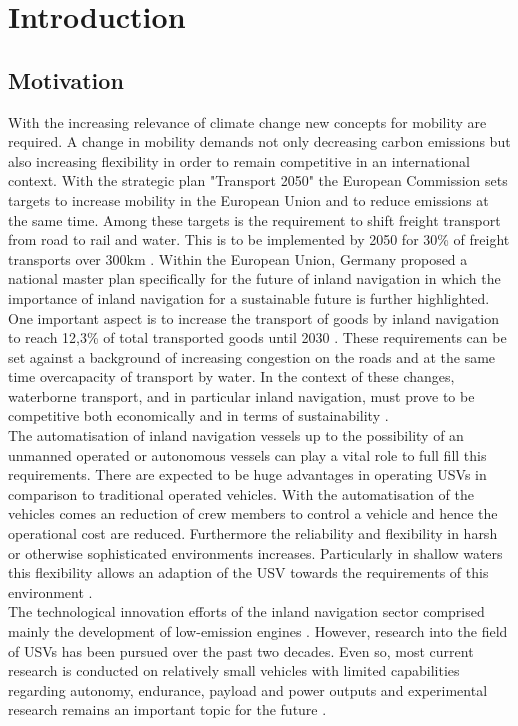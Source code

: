 
\chapter{Introduction}\label{Introduction}
  \section{Motivation}

With the increasing relevance of climate change new concepts for mobility are required. A change in mobility demands not only decreasing carbon emissions but also increasing flexibility in order to remain competitive in an international context. With the strategic plan "Transport 2050" the European Commission sets targets to increase mobility in the European Union and to reduce emissions at the same time. Among these targets is the requirement to shift freight transport from road to rail and water. This is to be implemented by 2050 for 30\% of freight transports over 300km \cite{Transport2050}. Within the European Union, Germany proposed a national master plan specifically for the future of inland navigation in which the importance of inland navigation for a sustainable future is further highlighted. One important aspect is to increase the transport of goods by inland navigation to reach 12,3\% of total transported goods until 2030 \cite{MasterplanBinnen}. These requirements can be set against a background of increasing congestion on the roads and at the same time overcapacity of transport by water. In the context of these changes, waterborne transport, and in particular inland navigation, must prove to be competitive both economically and in terms of sustainability \cite{Christa2020}.\\

The automatisation of inland navigation vessels up to the possibility of an unmanned operated or autonomous vessels can play a vital role to full fill this requirements. There are expected to be huge advantages in operating \acp{USV} in comparison to traditional operated vehicles. With the automatisation of the vehicles comes an reduction of crew members to control a vehicle and hence the operational cost are reduced. Furthermore the reliability and flexibility in harsh or otherwise sophisticated environments increases. Particularly in shallow waters this flexibility allows an adaption of the \ac{USV} towards the requirements of this environment \cite{Liu2016}.\\

The technological innovation efforts of the inland navigation sector comprised mainly the development of low-emission engines \cite{Christa2020}. However, research into the field of \acp{USV} has been pursued over the past two decades. Even so, most current research is conducted on relatively small vehicles with limited capabilities regarding autonomy, endurance, payload and power outputs and experimental research remains an important topic for the future \cite{Liu2016}. \\

